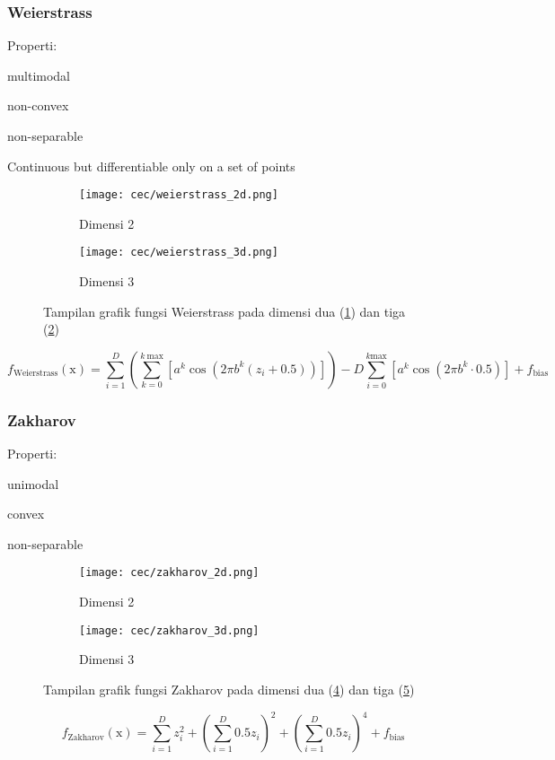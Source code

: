 \subsubsection{Weierstrass}
\noindent Properti:
\begin{packed_item}
  \item multimodal
  \item non-convex
  \item non-separable
  \item Continuous but differentiable only on a set of points
\end{packed_item}
\begin{figure}[H]
	\centering
	\begin{subfigure}[b]{0.4\textwidth}
		\centering
		\texttt{[image: cec/weierstrass\_2d.png]}
		\caption{Dimensi 2}
		\label{fig:weierstrass-2d}
	\end{subfigure}
	\hfill
	\begin{subfigure}[b]{0.4\textwidth}
		\centering
		\texttt{[image: cec/weierstrass\_3d.png]}
		\caption{Dimensi 3}
		\label{fig:weierstrass-3d}
	\end{subfigure}
	\caption{Tampilan grafik fungsi Weierstrass pada dimensi dua (\cref{fig:weierstrass-2d}) dan tiga (\cref{fig:weierstrass-3d})}
	\label{fig:weierstrass}
\end{figure}
\begin{equation}
  f_{\text{Weierstrass}}(\mathrm{x})=\sum_{i=1}^{D}\left(\sum_{k=0}^{k\ \text{max}}\left[a^k\cos\left(2\pi b^k\left( z_i+0.5\right)  \right)  \right]  \right)-D\sum_{i=0}^{k \text{max}}\left[ a^k\cos\left(2\pi b^k\cdot0.5 \right) \right]  +f_{\text{bias}}
\end{equation}

\subsubsection{Zakharov}
\noindent Properti:
\begin{packed_item}
  \item unimodal
  \item convex
  \item non-separable
\end{packed_item}
\begin{figure}[H]
	\centering
	\begin{subfigure}[b]{0.4\textwidth}
		\centering
		\texttt{[image: cec/zakharov\_2d.png]}
		\caption{Dimensi 2}
		\label{fig:zakharov-2d}
	\end{subfigure}
	\hfill
	\begin{subfigure}[b]{0.4\textwidth}
		\centering
		\texttt{[image: cec/zakharov\_3d.png]}
		\caption{Dimensi 3}
		\label{fig:zakharov-3d}
	\end{subfigure}
	\caption{Tampilan grafik fungsi Zakharov pada dimensi dua (\cref{fig:zakharov-2d}) dan tiga (\cref{fig:zakharov-3d})}
	\label{fig:zakharov}
\end{figure}
\begin{equation}
  f_{\text{Zakharov}}(\mathrm{x})=\sum_{i=1}^{D}z_i^2+\left(\sum_{i=1}^{D}0.5z_i \right)^2+\left(\sum_{i=1}^{D}0.5z_i \right)^4+f_{\text{bias}}
\end{equation}

